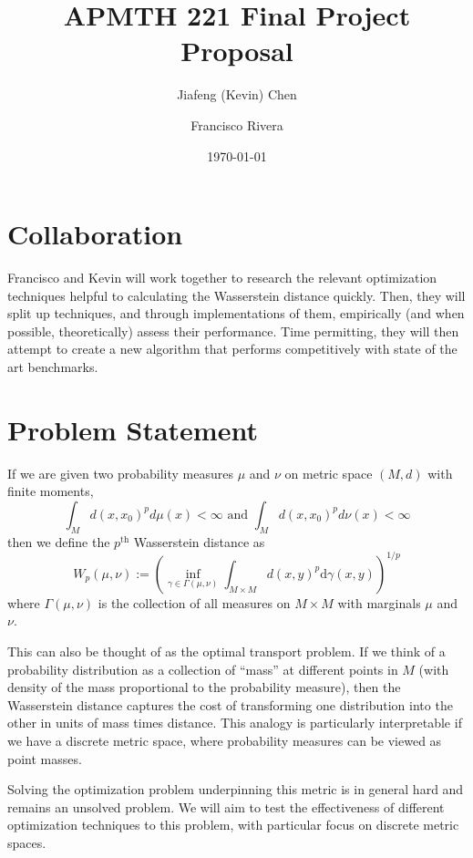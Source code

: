 \documentclass[a4paper]{amsart}
\begin{document}
\title{APMTH 221 Final Project Proposal}
\author{Jiafeng (Kevin) Chen \and Francisco Rivera}
\date{\today}

\maketitle

\section{Collaboration}

Francisco and Kevin will work together to research the relevant optimization
techniques helpful to calculating the Wasserstein distance quickly. Then, they
will split up techniques, and through implementations of them, empirically (and
when possible, theoretically) assess their performance. Time permitting, they
will then attempt to create a new algorithm that performs competitively with
state of the art benchmarks.

\section{Problem Statement}

If we are given two probability measures $\mu$ and $\nu$ on metric space
$(M,d)$ with finite moments,
\[ \int_M d(x,x_0)^p d\mu(x) < \infty \text{ and }\int_M d(x,x_0)^p d\nu(x) <
\infty\]
then we define the $p^\text{th}$ Wasserstein distance as
\[ W_p(\mu, \nu) := \left( \inf_{\gamma \in \Gamma(\mu, \nu)} \int_{M \times
M} d(x,y)^p \text{d} \gamma(x,y) \right)^{1/p}\]
where $\Gamma(\mu, \nu)$ is the collection of all measures on $M \times M$ with
marginals $\mu$ and $\nu$.

This can also be thought of as the optimal transport problem. If we think of a
probability distribution as a collection of ``mass'' at different points in $M$
(with density of the mass proportional to the probability measure), then the
Wasserstein distance captures the cost of transforming one distribution into the
other in units of mass times distance.  This analogy is particularly
interpretable if we have a discrete metric space, where probability measures can
be viewed as point masses.

Solving the optimization problem underpinning this metric is in general hard and
remains an unsolved problem. We will aim to test the effectiveness of different
optimization techniques to this problem, with particular focus on discrete
metric spaces.
\end{document}
